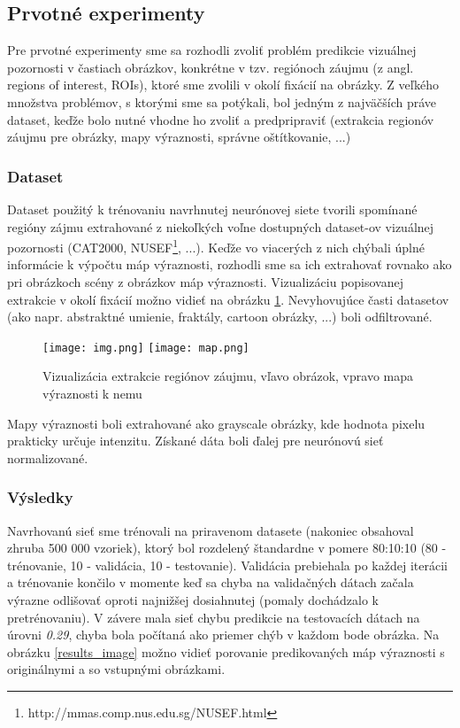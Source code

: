 \subsection{Prvotné experimenty}
\label{first_experiments}
Pre prvotné experimenty sme sa rozhodli zvoliť problém predikcie vizuálnej pozornosti v častiach obrázkov, konkrétne v tzv. regiónoch záujmu (z angl. regions of interest, ROIs), ktoré sme zvolili v okolí fixácií na obrázky. Z veľkého množstva problémov, s ktorými sme sa potýkali, bol jedným z najväčších práve dataset, keďže bolo nutné vhodne ho zvoliť a predpripraviť (extrakcia regionóv záujmu pre obrázky, mapy výraznosti, správne oštítkovanie, ...)

\subsubsection{Dataset}
\label{dataset}
Dataset použitý k trénovaniu navrhnutej neurónovej siete tvorili spomínané regióny zájmu extrahované z niekoľkých voľne dostupných dataset-ov vizuálnej pozornosti (CAT2000\cite{borji2015cat2000}, NUSEF\footnote{http://mmas.comp.nus.edu.sg/NUSEF.html}, ...). Keďže vo viacerých z nich chýbali úplné informácie k výpočtu máp výraznosti, rozhodli sme sa ich extrahovať rovnako ako pri obrázkoch scény z obrázkov máp výraznosti. Vizualizáciu popisovanej extrakcie v okolí fixácií možno vidieť na obrázku \ref{roi_image}. Nevyhovujúce časti datasetov (ako napr. abstraktné umienie, fraktály, cartoon obrázky, ...) boli odfiltrované.

\begin{figure}[H]
	\begin{center}
		\texttt{[image: img.png]}
		\texttt{[image: map.png]}
		\caption[Vizualizácia extrakcie regiónov záujmu]{
			Vizualizácia extrakcie regiónov záujmu, vľavo obrázok, vpravo mapa výraznosti k nemu
		}\label{roi_image}
	\end{center}
\end{figure}

Mapy výraznosti boli extrahované ako grayscale obrázky, kde hodnota pixelu prakticky určuje intenzitu. Získané dáta boli ďalej pre neurónovú sieť normalizované.
\newline

\subsubsection{Výsledky}

Navrhovanú sieť sme trénovali na priravenom datasete (nakoniec obsahoval zhruba 500 000 vzoriek), ktorý bol rozdelený štandardne v pomere 80:10:10 (80 - trénovanie, 10 - validácia, 10 - testovanie). Validácia prebiehala po každej iterácii a trénovanie končilo v momente keď sa chyba na validačných dátach začala výrazne odlišovať oproti najnižšej dosiahnutej (pomaly dochádzalo k pretrénovaniu). V závere mala sieť chybu predikcie na testovacích dátach na úrovni \textit{0.29}, chyba bola počítaná ako priemer chýb v každom bode obrázka. Na obrázku \ref{results_image} možno vidieť porovanie predikovaných máp výraznosti s originálnymi a so vstupnými obrázkami. 

